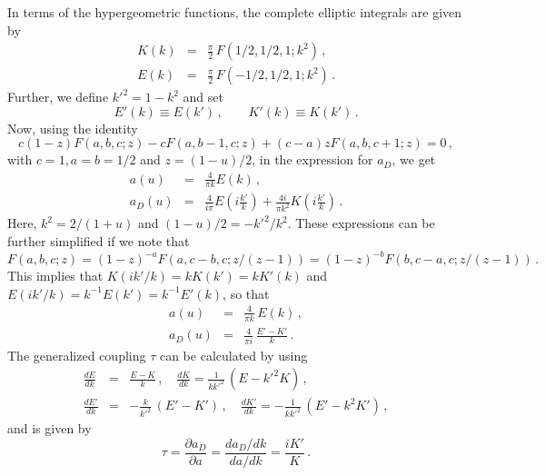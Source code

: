 In terms of the hypergeometric functions, the complete elliptic
integrals are given by 
\begin{eqnarray}
K(k) &=& \frac{\pi}{2}\, F\left(1/2, 1/2, 1; k^2\right)\,,\nonumber\\
E(k) &=& \frac{\pi}{2}\, F\left(-1/2, 1/2, 1; k^2\right)\,.\nonumber
\end{eqnarray}
Further, we define $k'^2=1-k^2$ and set 
$$
E'(k)\equiv E(k')\,,\qquad K'(k) \equiv K(k')\,.
$$ 
Now, using the identity
$$
c(1-z)F(a,b,c;z) - c F(a,b-1,c;z) + (c-a)z F(a,b,c+1;z)=0\,,
$$ 
with $c=1, a=b=1/2$ and $z=(1-u)/2$, in the expression for $a_D$, we
get 
\begin{eqnarray}
a(u)   &=& \frac{4}{\pi k} E(k)\,,\nonumber\\
a_D(u) &=& \frac{4}{i\pi} E(i\frac{k'}{k}) + 
\frac{4i}{\pi k^2} K(i\frac{k'}{k})\,.\nonumber
\end{eqnarray}
Here, $k^2=2/(1+u)$ and $(1-u)/2=-k'^2/k^2$. These expressions can be
further simplified if we note that  
$$
F(a, b, c; z)=(1-z)^{-a} F(a, c-b, c; z/(z-1))=
(1-z)^{-b} F(b, c-a, c; z/(z-1))\,.
$$
This implies that $K(ik'/k)=kK(k')=kK'(k)$ and $E(ik'/k)=k^{-1}E(k')
=k^{-1}E'(k)$, so that
\begin{eqnarray}
a(u)  &=& \frac{4}{\pi k}\, E(k)\,,\nonumber\\
a_D(u)&=& \frac{4}{\pi i}\,\frac{E'-K'}{k}\,.\nonumber
\end{eqnarray}
The generalized coupling $\tau$ can be calculated by using
\begin{eqnarray}
\frac{dE}{dk}&=&\frac{E-K}{k}\,,\quad 
\frac{dK}{dk}=\frac{1}{kk'^2}\,(E-k'^2 K)\,,\nonumber\\
\frac{dE'}{dk}&=&-\frac{k}{k'^2}\,(E'-K')\,,\quad 
\frac{dK'}{dk}=-\frac{1}{kk'^2}\,(E'-k^2 K')\,,\nonumber
\end{eqnarray}
and is given by
$$
\tau=\frac{\partial a_D}{\partial a}=\frac{da_D/dk}{da/dk}
=\frac{iK'}{K}\,.
$$
